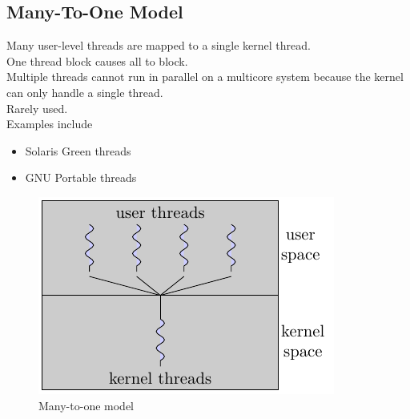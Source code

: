 \documentclass[oneside]{book}
\begin{document}
            \subsection{Many-To-One Model}
                Many user-level threads are mapped to a single kernel thread.\\
                One thread block causes all to block.\\
                Multiple threads cannot run in parallel on a multicore system because the kernel can only handle a single thread.\\
                Rarely used.\\
                Examples include
                \begin{itemize}
                    \item Solaris Green threads
                    \item GNU Portable threads
                \end{itemize}
                \begin{figure}[H]
                    \centering
                    \includegraphics{figures/many_to_one.pdf}
                    \caption{Many-to-one model}
                \end{figure}
\end{document}
